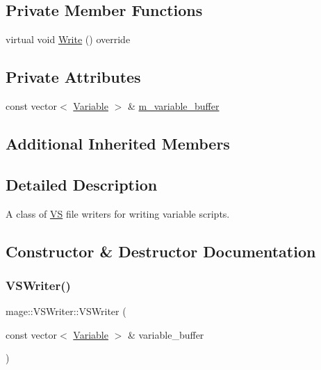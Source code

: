 \subsection*{Private Member Functions}
\begin{DoxyCompactItemize}
\item 
virtual void \hyperlink{classmage_1_1_v_s_writer_a417c8bcf7ab26e88b253e9ffbdb60192}{Write} () override
\end{DoxyCompactItemize}
\subsection*{Private Attributes}
\begin{DoxyCompactItemize}
\item 
const vector$<$ \hyperlink{structmage_1_1_variable}{Variable} $>$ \& \hyperlink{classmage_1_1_v_s_writer_a4f36e6a94d4fd8d3038f189a76582abe}{m\+\_\+variable\+\_\+buffer}
\end{DoxyCompactItemize}
\subsection*{Additional Inherited Members}


\subsection{Detailed Description}
A class of \hyperlink{structmage_1_1_v_s}{VS} file writers for writing variable scripts. 

\subsection{Constructor \& Destructor Documentation}
\hypertarget{classmage_1_1_v_s_writer_ac1a9ff905a94e9c89a7ed48dc7c4b629}{}\label{classmage_1_1_v_s_writer_ac1a9ff905a94e9c89a7ed48dc7c4b629} 
\subsubsection{\texorpdfstring{V\+S\+Writer()}{VSWriter()}\hspace{0.1cm}{\footnotesize\ttfamily [1/3]}}
{\footnotesize\ttfamily mage\+::\+V\+S\+Writer\+::\+V\+S\+Writer (\begin{DoxyParamCaption}\item[{const vector$<$ \hyperlink{structmage_1_1_variable}{Variable} $>$ \&}]{variable\+\_\+buffer }\end{DoxyParamCaption})\hspace{0.3cm}{\ttfamily [explicit]}}

